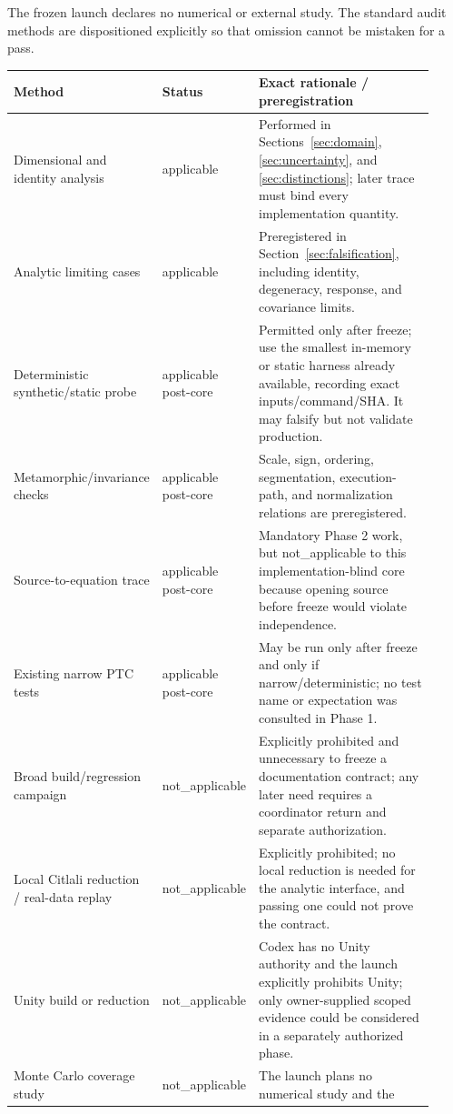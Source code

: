 \documentclass[11pt]{article}
\newcommand{\NA}{{\scriptsize\ttfamily not\_applicable}}
\begin{document}
The frozen launch declares no numerical or external study.  The standard
audit methods are dispositioned explicitly so that omission cannot be mistaken
for a pass.

\begin{longtable}{>{\raggedright\arraybackslash}p{0.25\linewidth}
                  >{\raggedright\arraybackslash}p{0.14\linewidth}
                  >{\raggedright\arraybackslash}p{0.53\linewidth}}
\toprule
Method & Status & Exact rationale / preregistration \\
\midrule
\endhead
Dimensional and identity analysis & applicable & Performed in
Sections~\ref{sec:domain}, \ref{sec:uncertainty}, and \ref{sec:distinctions};
later trace must bind every implementation quantity.\\
Analytic limiting cases & applicable & Preregistered in
Section~\ref{sec:falsification}, including identity, degeneracy, response, and
covariance limits.\\
Deterministic synthetic/static probe & applicable post-core & Permitted only
after freeze; use the smallest in-memory or static harness already available,
recording exact inputs/command/SHA.  It may falsify but not validate production.\\
Metamorphic/invariance checks & applicable post-core & Scale, sign, ordering,
segmentation, execution-path, and normalization relations are preregistered.\\
Source-to-equation trace & applicable post-core & Mandatory Phase 2 work, but
\NA{} to this implementation-blind core because opening source before freeze
would violate independence.\\
Existing narrow PTC tests & applicable post-core & May be run only after freeze
and only if narrow/deterministic; no test name or expectation was consulted in
Phase 1.\\
Broad build/regression campaign & \NA & Explicitly prohibited and unnecessary
to freeze a documentation contract; any later need requires a coordinator
return and separate authorization.\\
Local Citlali reduction / real-data replay & \NA & Explicitly prohibited; no
local reduction is needed for the analytic interface, and passing one could
not prove the contract.\\
Unity build or reduction & \NA & Codex has no Unity authority and the launch
explicitly prohibits Unity; only owner-supplied scoped evidence could be
considered in a separately authorized phase.\\
Monte Carlo coverage study & \NA & The launch plans no numerical study and the

\end{longtable}
\end{document}
